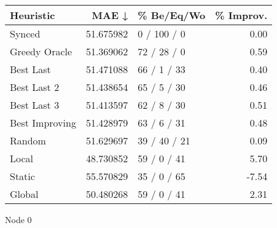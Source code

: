 \begin{tabular}{lrlr}
\toprule
      Heuristic &      MAE ↓ &    \% Be/Eq/Wo & \% Improv. \\
\midrule
         Synced &  51.675982 &   0 / 100 / 0 &      0.00 \\
  Greedy Oracle &  51.369062 &   72 / 28 / 0 &      0.59 \\
      Best Last &  51.471088 &   66 / 1 / 33 &      0.40 \\
    Best Last 2 &  51.438654 &   65 / 5 / 30 &      0.46 \\
    Best Last 3 &  51.413597 &   62 / 8 / 30 &      0.51 \\
 Best Improving &  51.428979 &   63 / 6 / 31 &      0.48 \\
         Random &  51.629697 &  39 / 40 / 21 &      0.09 \\
          Local &  48.730852 &   59 / 0 / 41 &      5.70 \\
         Static &  55.570829 &   35 / 0 / 65 &     -7.54 \\
         Global &  50.480268 &   59 / 0 / 41 &      2.31 \\
\bottomrule
\end{tabular}
\caption{Node 0}
\label{tab:non_lr005_le1_bs2_0}
